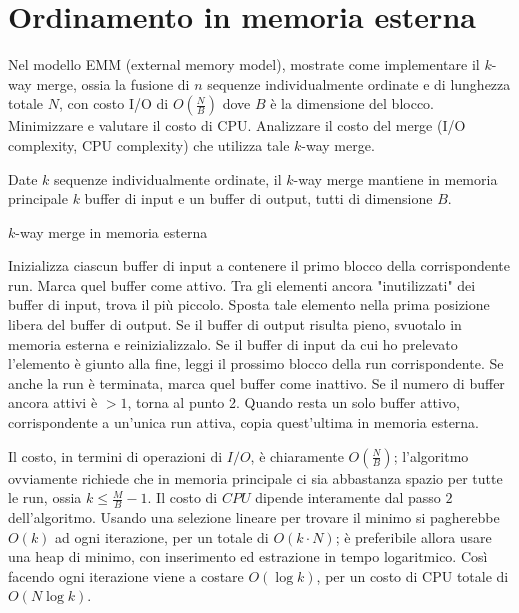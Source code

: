 \chapter{Ordinamento in memoria esterna}

\begin{problem*}
    Nel modello EMM (external memory model), mostrate come implementare il
    \(k\)-way merge, ossia la fusione di \(n\) sequenze individualmente
    ordinate e di lunghezza totale \(N\), con costo I/O di \(O(\frac{N}{B})\)
    dove \(B\) \`e la dimensione del blocco. Minimizzare e valutare il costo
    di CPU. Analizzare il costo del merge (I/O complexity, CPU complexity)
    che utilizza tale \(k\)-way merge.
\end{problem*}
Date $k$ sequenze individualmente ordinate, il $k$-way merge mantiene in memoria principale $k$ buffer di input e un buffer di output, tutti di dimensione $B$. 
\begin{algorithm}
\caption{$k$-way merge in memoria esterna}
\begin{algorithmic}[1]
\State Inizializza ciascun buffer di input a contenere il primo blocco della corrispondente run. Marca quel buffer come attivo.
\State Tra gli elementi ancora "inutilizzati" dei buffer di input, trova il più piccolo.
\State Sposta tale elemento nella prima posizione libera del buffer di output.
\State Se il buffer di output risulta pieno, svuotalo in memoria esterna e reinizializzalo.
\State Se il buffer di input da cui ho prelevato l'elemento è giunto alla fine, leggi il prossimo blocco della run corrispondente. Se anche la run è terminata, marca quel buffer come inattivo. Se il numero di buffer ancora attivi è $>1$, torna al punto 2.
\State Quando resta un solo buffer attivo, corrispondente a un'unica run attiva, copia quest'ultima in memoria esterna.
\end{algorithmic}	
\end{algorithm}
\newline
Il costo, in termini di operazioni di $I/O$, è chiaramente $O(\frac{N}{B})$; l'algoritmo ovviamente richiede che in memoria principale ci sia abbastanza spazio per tutte le run, ossia $k \le \frac{M}{B} - 1$.\newline
Il costo di $CPU$ dipende interamente dal passo $2$ dell'algoritmo. Usando una selezione lineare per trovare il minimo si pagherebbe $O(k)$ ad ogni iterazione, per un totale di $O(k\cdot N)$; è preferibile allora usare una heap di minimo, con inserimento ed estrazione in tempo logaritmico. Così facendo ogni iterazione viene a costare $O(\log k)$, per un costo di CPU totale di $O(N\log k)$.
